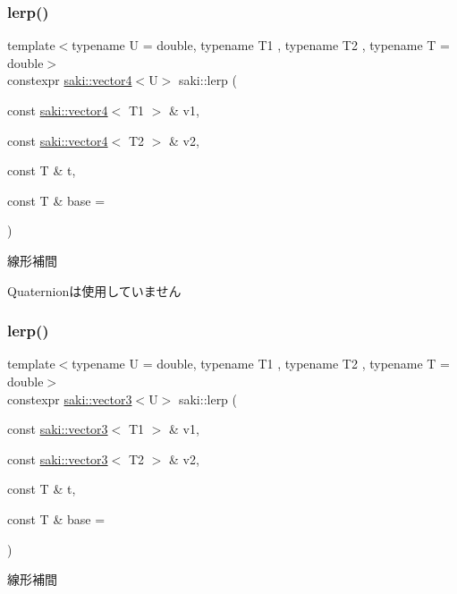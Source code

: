 \subsubsection{\texorpdfstring{lerp()}{lerp()}\hspace{0.1cm}{\footnotesize\ttfamily [2/3]}}
{\footnotesize\ttfamily template$<$typename U  = double, typename T1 , typename T2 , typename T  = double$>$ \\
constexpr \mbox{\hyperlink{classsaki_1_1vector4}{saki\+::vector4}}$<$U$>$ saki\+::lerp (\begin{DoxyParamCaption}\item[{const \mbox{\hyperlink{classsaki_1_1vector4}{saki\+::vector4}}$<$ T1 $>$ \&}]{v1,  }\item[{const \mbox{\hyperlink{classsaki_1_1vector4}{saki\+::vector4}}$<$ T2 $>$ \&}]{v2,  }\item[{const T \&}]{t,  }\item[{const T \&}]{base = {} }\end{DoxyParamCaption})}



線形補間 

Quaternionは使用していません \mbox{\label{namespacesaki_a1dc5233651ca71b38ed5a53ef304e480}} 
\subsubsection{\texorpdfstring{lerp()}{lerp()}\hspace{0.1cm}{\footnotesize\ttfamily [3/3]}}
{\footnotesize\ttfamily template$<$typename U  = double, typename T1 , typename T2 , typename T  = double$>$ \\
constexpr \mbox{\hyperlink{classsaki_1_1vector3}{saki\+::vector3}}$<$U$>$ saki\+::lerp (\begin{DoxyParamCaption}\item[{const \mbox{\hyperlink{classsaki_1_1vector3}{saki\+::vector3}}$<$ T1 $>$ \&}]{v1,  }\item[{const \mbox{\hyperlink{classsaki_1_1vector3}{saki\+::vector3}}$<$ T2 $>$ \&}]{v2,  }\item[{const T \&}]{t,  }\item[{const T \&}]{base = {} }\end{DoxyParamCaption})}



線形補間 

